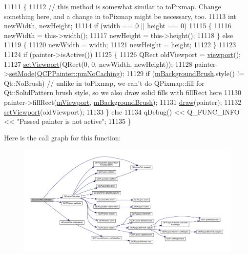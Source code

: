 \begin{DoxyCode}
11111 \{
11112   \textcolor{comment}{// this method is somewhat similar to toPixmap. Change something here, and a change in toPixmap might be
       necessary, too.}
11113   \textcolor{keywordtype}{int} newWidth, newHeight;
11114   \textcolor{keywordflow}{if} (width == 0 || height == 0)
11115   \{
11116     newWidth = this->width();
11117     newHeight = this->height();
11118   \} \textcolor{keywordflow}{else}
11119   \{
11120     newWidth = width;
11121     newHeight = height;
11122   \}
11123 
11124   \textcolor{keywordflow}{if} (painter->isActive())
11125   \{
11126     QRect oldViewport = \hyperlink{class_q_custom_plot_a953ecdbc28018e7e84cb6213ad3d88c2}{viewport}();
11127     \hyperlink{class_q_custom_plot_a3f9bc4b939dd8aaba9339fd09f273fc4}{setViewport}(QRect(0, 0, newWidth, newHeight));
11128     painter->\hyperlink{class_q_c_p_painter_af6b1f7d2bbc548b10aa55d8b6ad49577}{setMode}(\hyperlink{class_q_c_p_painter_a156cf16444ff5e0d81a73c615fdb156dae78f9a4eb277a5f9207f50850a51a0b0}{QCPPainter::pmNoCaching});
11129     \textcolor{keywordflow}{if} (\hyperlink{class_q_custom_plot_a3aef5de4ac012178e3293248e9c63737}{mBackgroundBrush}.style() != Qt::NoBrush) \textcolor{comment}{// unlike in toPixmap, we can't do
       QPixmap::fill for Qt::SolidPattern brush style, so we also draw solid fills with fillRect here}
11130       painter->fillRect(\hyperlink{class_q_custom_plot_ac0a7c38a715526c257cff95774f83ab6}{mViewport}, \hyperlink{class_q_custom_plot_a3aef5de4ac012178e3293248e9c63737}{mBackgroundBrush});
11131     \hyperlink{class_q_custom_plot_ad7a7d878bf050f101a43008e7d8fdb52}{draw}(painter);
11132     \hyperlink{class_q_custom_plot_a3f9bc4b939dd8aaba9339fd09f273fc4}{setViewport}(oldViewport);
11133   \} \textcolor{keywordflow}{else}
11134     qDebug() << Q\_FUNC\_INFO << \textcolor{stringliteral}{"Passed painter is not active"};
11135 \}
\end{DoxyCode}


Here is the call graph for this function\+:\nopagebreak
\begin{figure}[H]
\begin{center}
\leavevmode
\includegraphics[width=350pt]{class_q_custom_plot_a1be68d5c0f1e086d6374d1340a193fb9_cgraph}
\end{center}
\end{figure}


